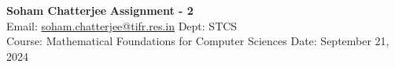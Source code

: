 \documentclass[a4paper, 11pt]{article}
\begin{document}
	
	
	{\noindent \large\textbf{Soham Chatterjee} \hfill \textbf{Assignment - 2}\\
		Email: \href{soham.chatterjee@tifr.res.in}{soham.chatterjee@tifr.res.in} \hfill Dept: STCS\\
		\normalsize Course: Mathematical Foundations for Computer Sciences \hfill Date: September 21, 2024}
	
\end{document}
